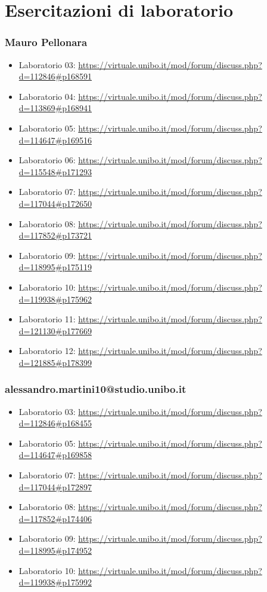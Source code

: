 \section{Esercitazioni di laboratorio}
\subsubsection*{Mauro Pellonara}
\begin{itemize}
    \item Laboratorio 03: \url{https://virtuale.unibo.it/mod/forum/discuss.php?d=112846#p168591}
    \item Laboratorio 04: \url{https://virtuale.unibo.it/mod/forum/discuss.php?d=113869#p168941}
    \item Laboratorio 05: \url{https://virtuale.unibo.it/mod/forum/discuss.php?d=114647#p169516}
    \item Laboratorio 06: \url{https://virtuale.unibo.it/mod/forum/discuss.php?d=115548#p171293}
    \item Laboratorio 07: \url{https://virtuale.unibo.it/mod/forum/discuss.php?d=117044#p172650}
    \item Laboratorio 08: \url{https://virtuale.unibo.it/mod/forum/discuss.php?d=117852#p173721}
    \item Laboratorio 09: \url{https://virtuale.unibo.it/mod/forum/discuss.php?d=118995#p175119}
    \item Laboratorio 10: \url{https://virtuale.unibo.it/mod/forum/discuss.php?d=119938#p175962}
    \item Laboratorio 11: \url{https://virtuale.unibo.it/mod/forum/discuss.php?d=121130#p177669}
    \item Laboratorio 12: \url{https://virtuale.unibo.it/mod/forum/discuss.php?d=121885#p178399}
\end{itemize}

\subsubsection*{alessandro.martini10@studio.unibo.it}
\begin{itemize}
    \item Laboratorio 03: \url{https://virtuale.unibo.it/mod/forum/discuss.php?d=112846#p168455}
    \item Laboratorio 05: \url{https://virtuale.unibo.it/mod/forum/discuss.php?d=114647#p169858}
    \item Laboratorio 07: \url{https://virtuale.unibo.it/mod/forum/discuss.php?d=117044#p172897}
    \item Laboratorio 08: \url{https://virtuale.unibo.it/mod/forum/discuss.php?d=117852#p174406}
    \item Laboratorio 09: \url{https://virtuale.unibo.it/mod/forum/discuss.php?d=118995#p174952}
    \item Laboratorio 10: \url{https://virtuale.unibo.it/mod/forum/discuss.php?d=119938#p175992}
\end{itemize}

